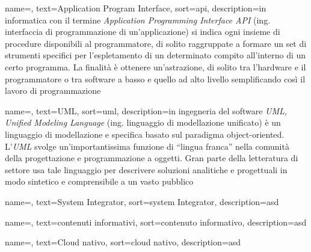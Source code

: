 
\renewcommand{\acronymname}{Acronimi e abbreviazioni}




{
    name=,
    text=Application Program Interface,
    sort=api,
    description={in informatica con il termine \emph{Application Programming Interface API} (ing. interfaccia di programmazione di un'applicazione) si indica ogni insieme di procedure disponibili al programmatore, di solito raggruppate a formare un set di strumenti specifici per l'espletamento di un determinato compito all'interno di un certo programma. La finalità è ottenere un'astrazione, di solito tra l'hardware e il programmatore o tra software a basso e quello ad alto livello semplificando così il lavoro di programmazione}
}

{
    name=,
    text=UML,
    sort=uml,
    description={in ingegneria del software \emph{UML, Unified Modeling Language} (ing. linguaggio di modellazione unificato) è un linguaggio di modellazione e specifica basato sul paradigma object-oriented. L'\emph{UML} svolge un'importantissima funzione di ``lingua franca'' nella comunità della progettazione e programmazione a oggetti. Gran parte della letteratura di settore usa tale linguaggio per descrivere soluzioni analitiche e progettuali in modo sintetico e comprensibile a un vasto pubblico}
}

{
    name=,
    text=System Integrator,
    sort=system Integrator,
    description=asd
}

{
    name=,
    text=contenuti informativi,
    sort=contenuto informativo,
    description=asd
}

{
    name=,
    text=Cloud nativo,
    sort=cloud nativo,
    description=asd
}

